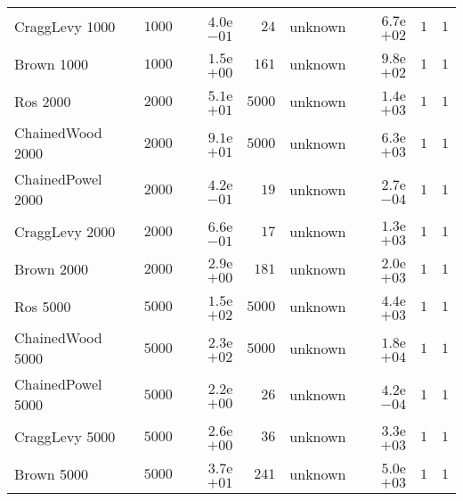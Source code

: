 \begin{longtable}[c]{lrrrrrrr}
CraggLevy 1000 & \( 1000\) & \( 4.0\)e\(-01\) & \(   24\) & unknown & \( 6.7\)e\(+02\) & \(    1\) & \(    1\) \\
Brown 1000 & \( 1000\) & \( 1.5\)e\(+00\) & \(  161\) & unknown & \( 9.8\)e\(+02\) & \(    1\) & \(    1\) \\
Ros 2000 & \( 2000\) & \( 5.1\)e\(+01\) & \( 5000\) & unknown & \( 1.4\)e\(+03\) & \(    1\) & \(    1\) \\
ChainedWood 2000 & \( 2000\) & \( 9.1\)e\(+01\) & \( 5000\) & unknown & \( 6.3\)e\(+03\) & \(    1\) & \(    1\) \\
ChainedPowel 2000 & \( 2000\) & \( 4.2\)e\(-01\) & \(   19\) & unknown & \( 2.7\)e\(-04\) & \(    1\) & \(    1\) \\
CraggLevy 2000 & \( 2000\) & \( 6.6\)e\(-01\) & \(   17\) & unknown & \( 1.3\)e\(+03\) & \(    1\) & \(    1\) \\
Brown 2000 & \( 2000\) & \( 2.9\)e\(+00\) & \(  181\) & unknown & \( 2.0\)e\(+03\) & \(    1\) & \(    1\) \\
Ros 5000 & \( 5000\) & \( 1.5\)e\(+02\) & \( 5000\) & unknown & \( 4.4\)e\(+03\) & \(    1\) & \(    1\) \\
ChainedWood 5000 & \( 5000\) & \( 2.3\)e\(+02\) & \( 5000\) & unknown & \( 1.8\)e\(+04\) & \(    1\) & \(    1\) \\
ChainedPowel 5000 & \( 5000\) & \( 2.2\)e\(+00\) & \(   26\) & unknown & \( 4.2\)e\(-04\) & \(    1\) & \(    1\) \\
CraggLevy 5000 & \( 5000\) & \( 2.6\)e\(+00\) & \(   36\) & unknown & \( 3.3\)e\(+03\) & \(    1\) & \(    1\) \\
Brown 5000 & \( 5000\) & \( 3.7\)e\(+01\) & \(  241\) & unknown & \( 5.0\)e\(+03\) & \(    1\) & \(    1\) \\
\hline 
\end{longtable}
